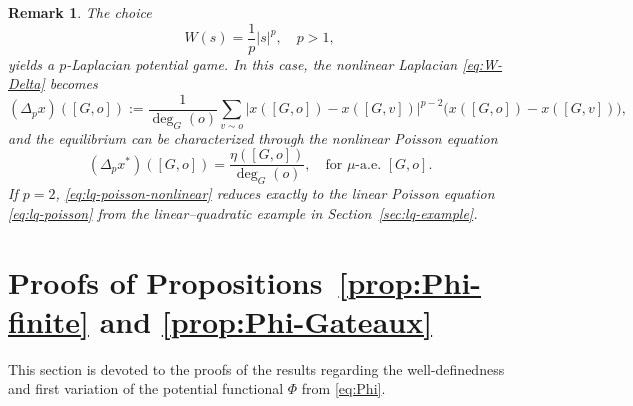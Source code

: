 \documentclass[11pt]{article}
\newcommand{\be}{\begin{equation}}
\newcommand{\ee}{\end{equation}}
\newtheorem{remark}[theorem]{Remark}
\numberwithin{equation}{section}
\begin{document}
\begin{remark}
The choice
\[
W(s)=\frac1p|s|^p,
\quad p>1,
\]
yields a \(p\)-Laplacian potential game. In this case, the nonlinear Laplacian \eqref{eq:W-Delta} becomes
\[
(\Delta_p x)([G,o])
:=
\frac1{\deg_G(o)}
\sum_{v\sim o}
|x([G,o])-x([G,v])|^{p-2}\big(x([G,o])-x([G,v])\big),
\]
and the equilibrium can be characterized through the nonlinear Poisson equation
\be\label{eq:lq-poisson-nonlinear}
(\Delta_p x^\ast)([G,o])
=
\frac{\eta([G,o])}{\deg_G(o)},
\quad \text{for } \mu\text{-a.e. } [G,o].
\ee
If \(p=2\), \eqref{eq:lq-poisson-nonlinear} reduces exactly to the linear Poisson equation \eqref{eq:lq-poisson} from the linear--quadratic example in Section~\ref{sec:lq-example}.
\end{remark}


\section{Proofs of Propositions~\ref{prop:Phi-finite} and \ref{prop:Phi-Gateaux}}\label{sec:proofs-Phi}

This section is devoted to the proofs of the results regarding the well-definedness and first variation of the potential functional $\Phi$ from \eqref{eq:Phi}.
\end{document}

